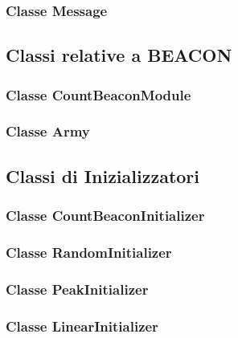 \documentclass[a4paper,12pt]{article}
\begin{document}


\subsubsection{Classe \textsf{Message}}



\subsection{Classi relative a BEACON}

\subsubsection{Classe \textsf{CountBeaconModule}}



\subsubsection{Classe \textsf{Army}}



\subsection{Classi di Inizializzatori}

\subsubsection{Classe \textsf{CountBeaconInitializer}}



\subsubsection{Classe \textsf{RandomInitializer}}



\subsubsection{Classe \textsf{PeakInitializer}}



\subsubsection{Classe \textsf{LinearInitializer}}
\end{document}
